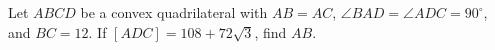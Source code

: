 Let $ABCD$ be a convex quadrilateral with $AB=AC$, $\angle BAD=\angle ADC=90^\circ$, and $BC=12$. If $[ADC]=108+72\sqrt3$, find $AB$.
